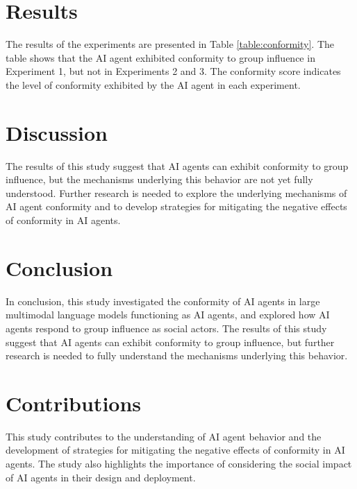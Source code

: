 \documentclass{article}
\begin{document}
        \section{Results}

        The results of the experiments are presented in Table \ref{table:conformity}. The table shows that the AI agent exhibited conformity to group influence in Experiment 1, but not in Experiments 2 and 3. The conformity score indicates the level of conformity exhibited by the AI agent in each experiment.

        \section{Discussion}

        The results of this study suggest that AI agents can exhibit conformity to group influence, but the mechanisms underlying this behavior are not yet fully understood. Further research is needed to explore the underlying mechanisms of AI agent conformity and to develop strategies for mitigating the negative effects of conformity in AI agents.

        \section{Conclusion}

        In conclusion, this study investigated the conformity of AI agents in large multimodal language models functioning as AI agents, and explored how AI agents respond to group influence as social actors. The results of this study suggest that AI agents can exhibit conformity to group influence, but further research is needed to fully understand the mechanisms underlying this behavior.

        \section{Contributions}

        This study contributes to the understanding of AI agent behavior and the development of strategies for mitigating the negative effects of conformity in AI agents. The study also highlights the importance of considering the social impact of AI agents in their design and deployment.

        
        

        
\end{document}

